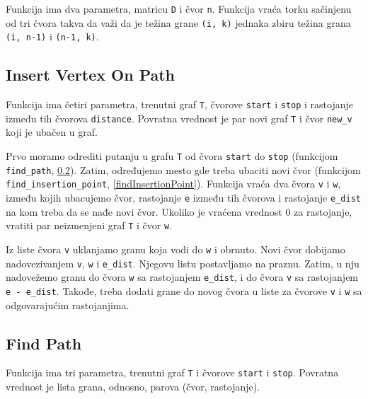 Funkcija ima dva parametra, matricu \texttt{D} i čvor \texttt{n}. Funkcija vraća torku sačinjenu od tri čvora takva da važi da je težina grane \texttt{(i, k)} jednaka zbiru težina grana \texttt{(i, n-1)} i \texttt{(n-1, k)}. 




\subsection{Insert Vertex On Path}
\label{insertVertexOnPath}

Funkcija ima četiri parametra, trenutni graf \texttt{T}, čvorove \texttt{start} i \texttt{stop} i rastojanje između tih čvorova \texttt{distance}. Povratna vrednost je par novi graf \texttt{T} i čvor \texttt{new\_v} koji je ubačen u graf.

Prvo moramo odrediti putanju u grafu \texttt{T} od čvora \texttt{start} do \texttt{stop} (funkcijom \texttt{find\_path}, \ref{findPath}). Zatim, određujemo mesto gde treba ubaciti novi čvor (funkcijom \texttt{find\_insertion\_point}, \ref{findInsertionPoint}). Funkcija vraća dva čvora \texttt{v} i \texttt{w}, između kojih ubacujemo čvor, rastojanje \texttt{e} između tih čvorova i rastojanje \texttt{e\_dist} na kom treba da se nađe novi čvor. Ukoliko je vraćena vrednost 0 za rastojanje, vratiti par neizmenjeni graf \texttt{T} i čvor \texttt{w}. 

Iz liste čvora \texttt{v} uklanjamo granu koja vodi do \texttt{w} i obrnuto. Novi čvor dobijamo nadovezivanjem \texttt{v}, \texttt{w} i \texttt{e\_dist}. Njegovu listu postavljamo na praznu. Zatim, u nju nadovežemo granu do čvora \texttt{w} sa rastojanjem \texttt{e\_dist}, i do čvora \texttt{v} sa rastojanjem \texttt{e - e\_dist}. Takođe, treba dodati grane do novog čvora u liste za čvorove \texttt{v} i \texttt{w} sa odgovarajućim rastojanjima.




\subsection{Find Path}
\label{findPath}

Funkcija ima tri parametra, trenutni graf \texttt{T} i čvorove \texttt{start} i \texttt{stop}. Povratna vrednost je lista grana, odnosno, parova (čvor, rastojanje).

